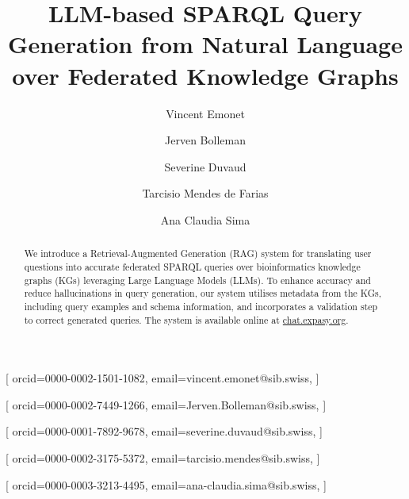 \documentclass[
]{ceurart}
\begin{document}


\title{LLM-based SPARQL Query Generation from Natural Language over Federated Knowledge Graphs}

\author[1]{Vincent Emonet}[%
orcid=0000-0002-1501-1082,
email=vincent.emonet@sib.swiss,
]
\cormark[1]
\address[1]{SIB Swiss Institute of Bioinformatics, Switzerland}

\author[1]{Jerven Bolleman}[%
orcid=0000-0002-7449-1266,
email=Jerven.Bolleman@sib.swiss,
]

\author[1]{Severine Duvaud}[%
orcid=0000-0001-7892-9678,
email=severine.duvaud@sib.swiss,
]

\author[1]{Tarcisio {Mendes de Farias}}[%
orcid=0000-0002-3175-5372,
email=tarcisio.mendes@sib.swiss,
]

\author[1]{Ana Claudia Sima}[%
orcid=0000-0003-3213-4495,
email=ana-claudia.sima@sib.swiss,
]


\begin{abstract}
We introduce a Retrieval-Augmented Generation (RAG) system for translating user questions into accurate federated SPARQL queries over bioinformatics knowledge graphs (KGs) leveraging Large Language Models (LLMs). To enhance accuracy and reduce hallucinations in query generation, our system utilises metadata from the KGs, including query examples and schema information, and incorporates a validation step to correct generated queries. The system is available online at \href{https://chat.expasy.org}{chat.expasy.org}. 
\end{abstract}

\end{document}
